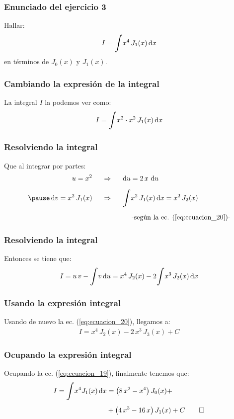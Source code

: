 \documentclass[12pt]{beamer}
\begin{document}
\begin{frame}
\frametitle{Enunciado del ejercicio 3}
Hallar:
\begin{align*}
I = \displaystyle \scaleint{6ex} x^{4} \, J_{1}(x) \dd{x}
\end{align*}
en términos de $J_{0}(x)$ y $J_{1}(x)$.
\end{frame}
\begin{frame}
\frametitle{Cambiando la expresión de la integral}
La integral $I$ la podemos ver como:
\pause
\begin{align*}
I = \scaleint{6ex} x^{2} \cdot x^{2} \, J_{1}(x) \dd{x}
\end{align*}
\end{frame}
\begin{frame}
\frametitle{Resolviendo la integral}
Que al integrar por partes:
\pause
\begin{eqnarray*}
\begin{aligned}
u = x^{2} \hspace{0.5cm} &\Rightarrow \hspace{0.5cm} \dd{u} = 2\, x \, \dd{u} \\[0.5em] \pause
\dd{v} = x^{2} \, J_{1} (x) \hspace{0.5cm} &\Rightarrow \hspace{0.5cm} \scaleint{6ex} x^{2} \, J_{1}(x) \dd{x} = x^{2} \, J_{2}(x) \\[0.5em]
& \hspace{1.5cm} \mbox{-según la ec. (\ref{eq:ecuacion_20})-}
\end{aligned}
\end{eqnarray*}
\end{frame}
\begin{frame}
\frametitle{Resolviendo la integral}
Entonces se tiene que:
\pause
\begin{align*}
I = u \, v - \scaleint{6ex} v \dd{u} = x^{4} \, J_{2}(x) - 2 \scaleint{6ex} x^{3} \, J_{2} (x) \dd{x}
\end{align*}
\end{frame}
\begin{frame}
\frametitle{Usando la expresión integral}
Usando de nuevo la ec. (\ref{eq:ecuacion_20}), llegamos a:
\pause
\begin{align*}
I = x^{4} \, J_{2}(x) - 2 \, x^{3} \, J_{3}(x) + C
\end{align*}
\end{frame}
\begin{frame}
\frametitle{Ocupando la expresión integral}
Ocupando la ec. (\ref{eq:ecuacion_19}), finalmente tenemos que:
\pause
\begin{align*}
I = \scaleint{6ex} x^{4} J_{1}(x) \dd{x} &= \big( 8 \, x^{2} - x^{4} \big) \, J_{0} (x) + \\[0.5em]
&+ \big( 4 \, x^{3} - 16 \, x \big) \, J_{1}(x) + C \qed
\end{align*}
\end{frame}
\end{document}
